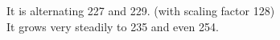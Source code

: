 It is alternating 227 and 229. (with scaling factor 128)\\
It grows very steadily to 235 and even 254.